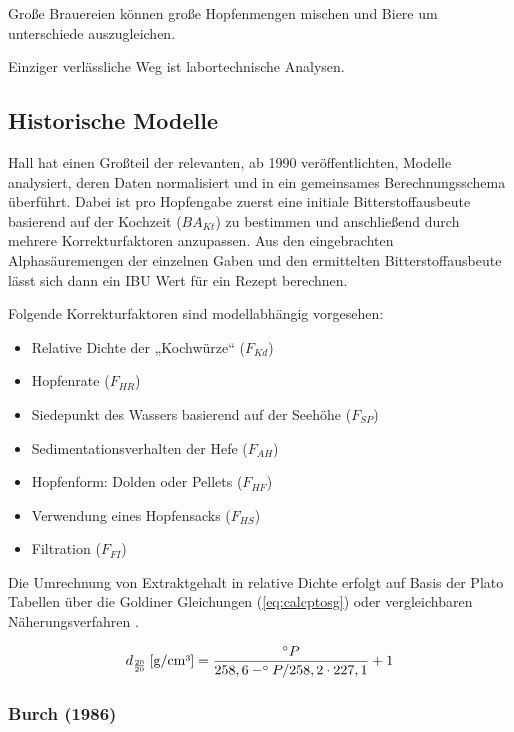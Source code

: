 \documentclass[a4paper,parskip=half]{scrartcl}
\newcommand{\BAKt}{{\mathit{BA}}_{\mathit{Kt}}}
\newcommand{\uden}{\:[\text{g/cm³}]}
\newcommand{\FKd}{F_{\mathit{Kd}}}
\newcommand{\FHR}{F_{\mathit{HR}}}
\newcommand{\FSP}{F_{\mathit{SP}}}
\newcommand{\FAH}{F_{\mathit{AH}}}
\newcommand{\FHF}{F_{\mathit{HF}}}
\newcommand{\FHS}{F_{\mathit{HS}}}
\newcommand{\FFil}{F_{\mathit{FI}}}
\begin{document}
\parencite[76]{Daniels1996}
Große Brauereien können große Hopfenmengen mischen und
Biere um unterschiede auszugleichen.

\parencite[51]{Holle2010}
Einziger verlässliche Weg ist labortechnische Analysen.




\subsection*{Historische Modelle}

Hall hat einen Großteil der relevanten, ab 1990 veröffentlichten, Modelle analysiert,
deren Daten normalisiert und in ein gemeinsames Berechnungsschema überführt. Dabei ist
pro Hopfengabe zuerst eine initiale Bitterstoffausbeute basierend auf der Kochzeit
($\BAKt$) zu bestimmen und anschließend durch mehrere Korrekturfaktoren anzupassen.
Aus den eingebrachten Alphasäuremengen der einzelnen Gaben und den ermittelten
Bitterstoffausbeute lässt sich dann ein IBU Wert für ein Rezept berechnen. \parencite[59-65]{Hall1997}


Folgende Korrekturfaktoren sind modellabhängig vorgesehen:

\begin{itemize}
\item Relative Dichte der „Kochwürze“ ($\FKd$)
\item Hopfenrate ($\FHR$)
\item Siedepunkt des Wassers basierend auf der Seehöhe ($\FSP$)
\item Sedimentationsverhalten der Hefe ($\FAH$)
\item Hopfenform: Dolden oder Pellets ($\FHF$)
\item Verwendung eines Hopfensacks ($\FHS$)
\item Filtration ($\FFil$)
\end{itemize}

Die Umrechnung von Extraktgehalt in relative Dichte erfolgt auf Basis
der Plato Tabellen über die Goldiner Gleichungen (\autoref{eq:calcptosg})
oder vergleichbaren Näherungsverfahren \parencite[140\psq]{Spedding2016}.

\begin{equation}
d_{\frac{20}{20}} \uden = \frac{\degree P}{258,6 - \degree P / 258,2 \cdot 227,1} + 1
\label{eq:calcptosg}
\end{equation}

\subsubsection*{Burch (1986)}
\end{document}
